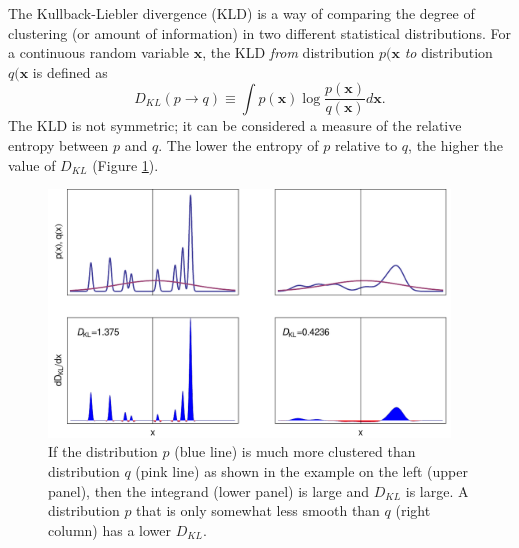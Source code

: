 \documentclass[useAMS,usenatbib,a4paper,referee]{mn2e}
\begin{document}
The Kullback-Liebler divergence (KLD) is a way of comparing the degree of clustering (or amount of information) in two different statistical distributions. For a continuous random variable $\mathbf{x}$, the KLD \emph{from} distribution $p(\mathbf{x}$ \emph{to} distribution $q(\mathbf{x}$ is defined as
\begin{equation}
 D_{KL}(p\to q) \equiv \int p(\mathbf{x}) \log \frac{p(\mathbf{x})}{q(\mathbf{x})} d\mathbf{x}.
\end{equation}
The KLD is not symmetric; it can be considered a measure of the relative entropy between $p$ and $q$. The lower the entropy of $p$ relative to $q$, the higher the value of $D_{KL}$ (Figure \ref{fig:1Dexample}).
\begin{figure}
 \includegraphics[width=0.95\textwidth]{KLDiv_1D_Example}
\caption{If the distribution $p$ (blue line) is much more clustered than distribution $q$ (pink line) as shown in the example on the left (upper panel), then the integrand (lower panel) is large and $D_{KL}$ is large. A distribution $p$ that is only somewhat less smooth than $q$ (right column) has a lower $D_{KL}$.}
\label{fig:1Dexample}
\end{figure}
\end{document}
